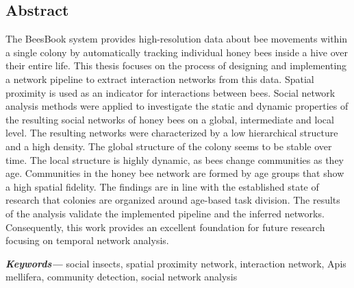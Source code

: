 %
\pagestyle{empty}
\providecommand{\keywords}[1]{\textbf{\textit{Keywords---}} #1}

\subsection*{Abstract}
The BeesBook system provides high-resolution data about bee movements within a single colony by automatically tracking individual honey bees inside a hive over their entire life.
This thesis focuses on the process of designing and implementing a network pipeline to extract interaction networks from this data.
Spatial proximity is used as an indicator for interactions between bees.
Social network analysis methods were applied to investigate the static and dynamic properties of the resulting social networks of honey bees on a global, intermediate and local level.
The resulting networks were characterized by a low hierarchical structure and a high density.
The global structure of the colony seems to be stable over time.
The local structure is highly dynamic, as bees change communities as they age.
Communities in the honey bee network are formed by age groups that show a high spatial fidelity.
The findings are in line with the established state of research that colonies are organized around age-based task division.
The results of the analysis validate the implemented pipeline and the inferred networks.
Consequently, this work provides an excellent foundation for future research focusing on temporal network analysis.

\vspace{5mm}
\keywords{social insects, spatial proximity network, interaction network, Apis mellifera, community detection, social network analysis}

\cleardoublepage
